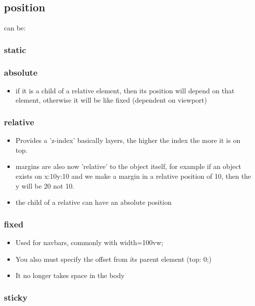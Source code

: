 \documentclass[11pt]{article}
\begin{document}
\subsection{position}
\label{sec:orgd01f5f6}
can be:
\subsubsection{static}
\label{sec:org890436f}
\subsubsection{absolute}
\label{sec:org1ad20df}
\begin{itemize}
\item if it is a child of a relative element, then its position will depend on that element, otherwise it will be like fixed (dependent on viewport)
\end{itemize}
\subsubsection{relative}
\label{sec:orge5100e6}
\begin{itemize}
\item Provides a 'z-index' basically layers, the higher the index the more it is on top.
\item margins are also now 'relative' to the object itself, for example if an object exists on x:10y:10 and we make a margin in a relative position of 10, then the y will be 20 not 10.
\item the child of a relative can have an absolute position
\end{itemize}
\subsubsection{fixed}
\label{sec:org71d387e}
\begin{itemize}
\item Used for navbars, commonly with width=100vw;
\item You also must specify the offset from its parent element (top: 0;)
\item It no longer takes space in the body
\end{itemize}
\subsubsection{sticky}
\label{sec:org09d28c9}
\end{document}
